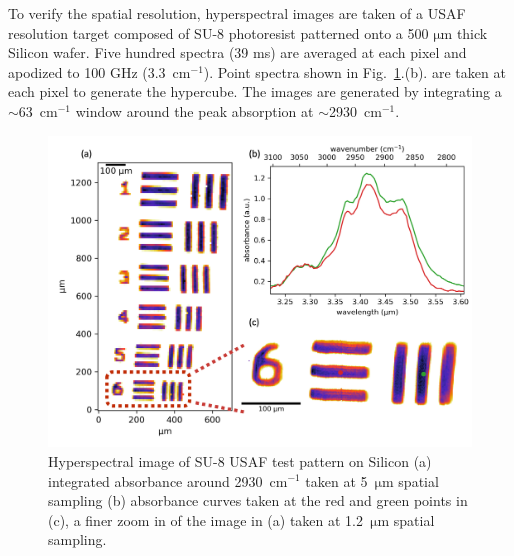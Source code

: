\documentclass{optica-article}
\begin{document}


To verify the spatial resolution, hyperspectral images are taken of a USAF resolution target composed of SU-8 photoresist patterned onto a 500 $\mathrm{\mu m}$ thick Silicon wafer. Five hundred spectra (39 ms) are averaged at each pixel and apodized to 100 GHz (\mbox{3.3 $\mathrm{cm^{-1}}$}). Point spectra shown in \mbox{Fig. \ref{fig:su8}.(b).} are taken at each pixel to generate the hypercube. The images are generated by integrating a \mbox{$\sim$63 $\mathrm{cm^{-1}}$} window around the peak absorption at \mbox{$\sim$2930 $\mathrm{cm^{-1}}$}. 


\begin{figure}[h]
    \centering
    \includegraphics[width=\linewidth]{su8_image.png}
    \caption{Hyperspectral image of SU-8 USAF test pattern on Silicon (a) integrated absorbance around \mbox{2930 $\mathrm{cm^{-1}}$} taken at \mbox{5 $\mathrm{\mu m}$} spatial sampling (b) absorbance curves taken at the red and green points in (c), a finer zoom in of the image in (a) taken at \mbox{1.2 $\mathrm{\mu m}$} spatial sampling.}
    \label{fig:su8}
\end{figure}
\end{document}
